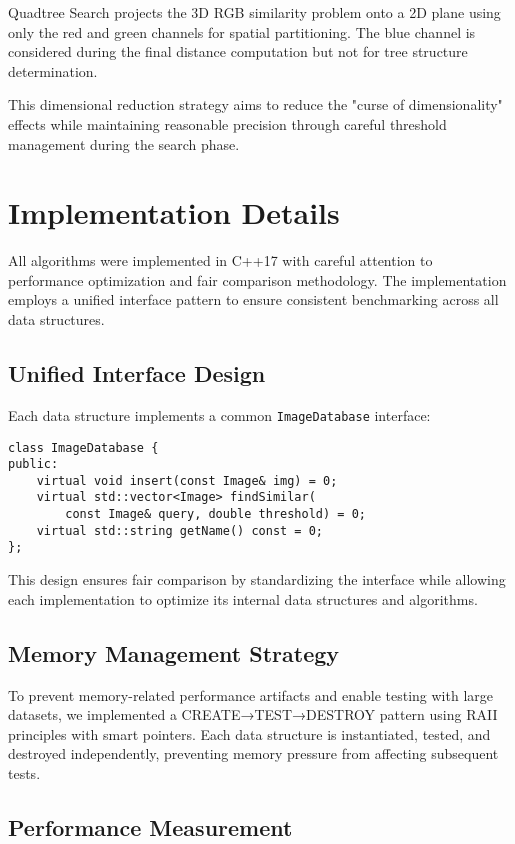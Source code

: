 \documentclass{sbc2023}
\begin{document}
Quadtree Search projects the 3D RGB similarity problem onto a 2D plane using only the red and green channels for spatial partitioning. The blue channel is considered during the final distance computation but not for tree structure determination.

This dimensional reduction strategy aims to reduce the "curse of dimensionality" effects while maintaining reasonable precision through careful threshold management during the search phase.

\section{Implementation Details}
\label{sec:implementation}

All algorithms were implemented in C++17 with careful attention to performance optimization and fair comparison methodology. The implementation employs a unified interface pattern to ensure consistent benchmarking across all data structures.

\subsection{Unified Interface Design}

Each data structure implements a common \texttt{ImageDatabase} interface:

\begin{verbatim}
class ImageDatabase {
public:
    virtual void insert(const Image& img) = 0;
    virtual std::vector<Image> findSimilar(
        const Image& query, double threshold) = 0;
    virtual std::string getName() const = 0;
};
\end{verbatim}

This design ensures fair comparison by standardizing the interface while allowing each implementation to optimize its internal data structures and algorithms.

\subsection{Memory Management Strategy}

To prevent memory-related performance artifacts and enable testing with large datasets, we implemented a CREATE→TEST→DESTROY pattern using RAII principles with smart pointers. Each data structure is instantiated, tested, and destroyed independently, preventing memory pressure from affecting subsequent tests.

\subsection{Performance Measurement}
\end{document}
